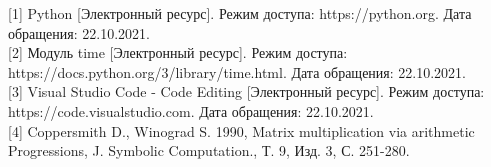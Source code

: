 \documentclass[12pt, a4paper]{report}
\begin{document}
[1] Python [Электронный ресурс]. Режим доступа: https://python.org. Дата обращения: 22.10.2021.\\

[2] Модуль time [Электронный ресурс]. Режим доступа: \newline https://docs.python.org/3/library/time.html. Дата обращения: 22.10.2021.\\

[3] Visual Studio Code - Code Editing [Электронный ресурс]. Режим доступа: https://code.visualstudio.com. Дата обращения: 22.10.2021.\\

[4] Coppersmith D., Winograd S. 1990, Matrix multiplication via arithmetic Progressions, J. Symbolic Computation., Т. 9, Изд. 3, С. 251-280.
\end{document}
